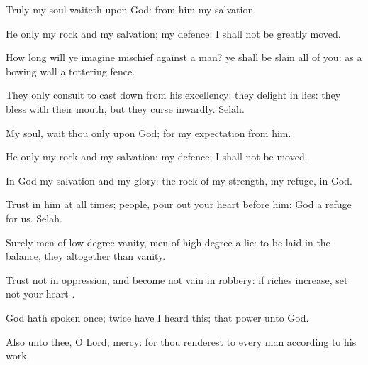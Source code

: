 {\Q {}Truly my
soul
waiteth upon
God: from him
{} my
salvation.


\par }{\Q {}He only
{} my
rock and my
salvation;
{} my
defence; I shall not be
greatly
moved.


\par }{\Q {}How long will ye imagine
mischief against a
man? ye shall be
slain all of you: as a
bowing
wall
{} a
tottering
fence.


\par }{\Q {}They only
consult to cast
{}
down from his
excellency: they
delight in
lies: they
bless with their
mouth, but they
curse
inwardly.
Selah.


\par }{\Q {}My
soul,
wait thou only upon
God; for my
expectation
{} from him.


\par }{\Q {}He only
{} my
rock and my
salvation:
{} my
defence; I shall not be
moved.


\par }{\Q {}In
God
{} my
salvation and my
glory: the
rock of my
strength,
{} my
refuge,
{} in
God.


\par }{\BB \par }
{\Q {}Trust in him at all
times;
{}
people, pour
out your
heart
before him:
God
{} a
refuge for us.
Selah.


\par }{\Q {}Surely
men of low degree
{}
vanity,
{}
men of high degree
{} a
lie: to be
laid in the
balance, they
{}
altogether
{} than
vanity.


\par }{\Q {}Trust not in
oppression, and become not
vain in
robbery: if
riches
increase,
set not your
heart
{}.


\par }{\Q {}God hath
spoken
once;
twice have I
heard
this; that
power
{} unto
God.


\par }{\Q {}Also unto thee, O
Lord,
{}
mercy: for thou
renderest to every
man according to his
work.




\par }
